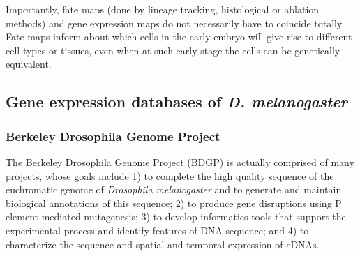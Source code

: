 \begin{mdframed}[style=boxstyle,frametitle={Box1. Fate maps and gene expression maps }]

Importantly, fate maps (done by lineage tracking, histological or ablation methods) and gene expression maps do not necessarily have to coincide totally. Fate maps inform about which cells in the early embryo will give rise to different cell types or tissues, even when at such early stage the cells can be genetically equivalent.

\end{mdframed}


\subsection{Gene expression databases of \textit{D. melanogaster}}


\subsubsection{Berkeley Drosophila Genome Project}

The Berkeley Drosophila Genome Project (BDGP) is actually comprised of many projects, whose goals include 1) to complete the high quality sequence of the euchromatic genome of \textit{Drosophila melanogaster} and to generate and maintain biological annotations of this sequence; 2) to produce gene disruptions using P element-mediated mutagenesis; 3) to develop informatics tools that support the experimental process and identify features of DNA sequence; and 4) to characterize the sequence and spatial and temporal expression of cDNAs.

